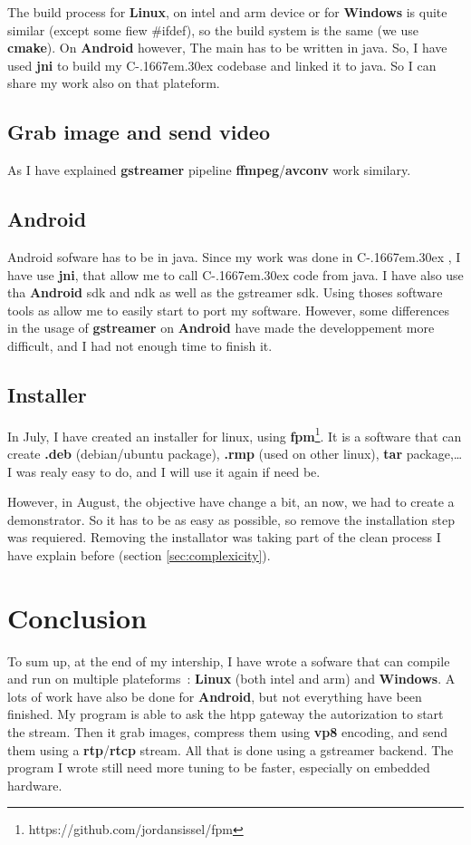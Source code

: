 \documentclass[a4paper,11pt]{custom}
\newcommand{\rtp}{\textbf{rtp}}
\newcommand{\rtcp}{\textbf{rtcp}}
\newcommand{\avconv}{\textbf{avconv}}
\newcommand{\ffmpeg}{\textbf{ffmpeg}}
\newcommand{\gstreamer}{\textbf{gstreamer}}
\newcommand{\vpx}{\textbf{vp8}}
\newcommand{\cmake}{\textbf{cmake}}
\newcommand{\jni}{\textbf{jni}}
\newcommand{\fpm}{\textbf{fpm}}
\newcommand{\linux}{\textbf{Linux}}
\newcommand{\win}{\textbf{Windows}}
\newcommand{\android}{\textbf{Android}}
\newcommand{\cpp}{%
  C\kern-.1667em\raise.30ex\hbox{\smaller{++}}%
  \spacefactor1000%
}
\begin{document}
The build process for \linux, on intel and arm device or for \win{} is quite
similar (except some fiew \#ifdef), so the build system is the same (we use
\cmake). On \android{} however, The main has to be written in java. So, I have
used \jni{} to build my \cpp{} codebase and linked it to java. So I can share my
work also on that plateform.

\subsection{Grab image and send video}

As I have explained
\gstreamer{} pipeline
\ffmpeg/\avconv{} work similary.

\subsection{Android}

Android sofware has to be in java. Since my work was done in \cpp, I have use
\jni, that allow me to call \cpp code from java. I have also use tha \android{}
sdk and ndk as well as the gstreamer sdk. Using thoses software tools as allow
me to easily start to port my software. However, some differences in the usage
of \gstreamer{} on \android{} have made the developpement more difficult, and I
had not enough time to finish it.

\subsection{Installer}

In July, I have created an installer for linux, using
\fpm{}\footnote{https://github.com/jordansissel/fpm}. It is a software that can
create \textbf{.deb} (debian/ubuntu package), \textbf{.rmp} (used on other
linux), \textbf{tar} package,… I was realy easy to do, and I will use it again
if need be.

However, in August, the objective have change a bit, an now, we had to create a
demonstrator. So it has to be as easy as possible, so remove the installation
step was requiered. Removing the installator was taking part of the clean
process I have explain before (section \ref{sec:complexicity}).

\section{Conclusion}

To sum up, at the end of my intership, I have wrote a sofware that can compile
and run on multiple plateforms~: \linux{} (both intel and arm) and \win. A lots
of work have also be done for \android, but not everything have been finished.
My program is able to ask the htpp gateway the autorization to start the stream.
Then it grab images, compress them using \vpx{} encoding, and send them using a
\rtp{}/\rtcp{} stream. All that is done using a gstreamer backend. The program I
wrote still need more tuning to be faster, especially on embedded hardware.
\end{document}
